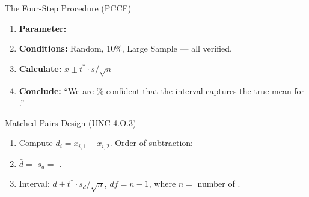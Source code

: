 \documentclass[10pt]{article}
\begin{document}
\begin{notesbox}{The Four-Step Procedure (PCCF)}
\begin{enumerate}
    \item \textbf{Parameter:} 
    \item \textbf{Conditions:} Random, 10\%, Large Sample --- all verified.
    \item \textbf{Calculate:} $\bar x \pm t^* \cdot s/\sqrt{n}$
    \item \textbf{Conclude:} ``We are \% confident that the interval captures
          the true mean \ans{[quantity]} for \ans{[population]}.''
\end{enumerate}
\end{notesbox}

\begin{notesbox}{Matched-Pairs Design (UNC-4.O.3)}
\begin{enumerate}
    \item Compute $d_i = x_{i,1} - x_{i,2}$.
          Order of subtraction: 
    \item $\bar d = $  \quad $s_d = $ .
    \item Interval: $\bar d \pm t^* \cdot s_d/\sqrt{n}$, $df = n - 1$,
          where $n = $ number of .
\end{enumerate}
\end{notesbox}
\end{document}
